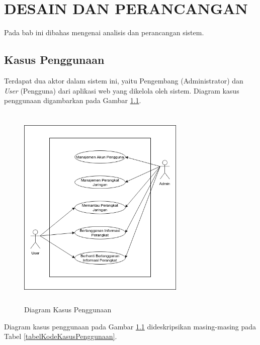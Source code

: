 \chapter{DESAIN DAN PERANCANGAN}
    Pada bab ini dibahas mengenai analisis dan perancangan sistem.
	
    \section{Kasus Penggunaan}
    	Terdapat dua aktor dalam sistem ini, yaitu Pengembang (Administrator) dan \textit{User} (Pengguna) dari aplikasi web yang dikelola oleh sistem. Diagram kasus penggunaan digambarkan pada Gambar \ref{usecase}.
        \begin{figure}[H]
			\centering
			\includegraphics[width=8cm,height=10cm]{Images/C-3/usecase.png}
			\caption{Diagram Kasus Penggunaan}
			\label{usecase}
		\end{figure}
        \indent Diagram kasus penggunaan pada Gambar \ref{usecase} dideskripsikan masing-masing pada Tabel \ref {tabelKodeKasusPenggunaan}.
        
